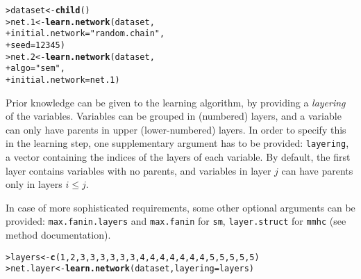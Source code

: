 \documentclass{article}\usepackage[]{graphicx}\usepackage[]{color}
\makeatletter
\newcommand{\hlnum}[1]{\textcolor[rgb]{0.686,0.059,0.569}{#1}}%
\newcommand{\hlstr}[1]{\textcolor[rgb]{0.192,0.494,0.8}{#1}}%
\newcommand{\hlstd}[1]{\textcolor[rgb]{0.345,0.345,0.345}{#1}}%
\newcommand{\hlkwb}[1]{\textcolor[rgb]{0.69,0.353,0.396}{#1}}%
\newcommand{\hlkwc}[1]{\textcolor[rgb]{0.333,0.667,0.333}{#1}}%
\newcommand{\hlkwd}[1]{\textcolor[rgb]{0.737,0.353,0.396}{\textbf{#1}}}%
\newenvironment{kframe}{%
 \def\at@end@of@kframe{}%
 \ifinner\ifhmode%
  \def\at@end@of@kframe{\end{minipage}}%
  \begin{minipage}{\columnwidth}%
 \fi\fi%
 \def\FrameCommand##1{\hskip\@totalleftmargin \hskip-\fboxsep
 \colorbox{shadecolor}{##1}\hskip-\fboxsep
     \hskip-\linewidth \hskip-\@totalleftmargin \hskip\columnwidth}%
 \MakeFramed {\advance\hsize-\width
   \@totalleftmargin\z@ \linewidth\hsize
   \@setminipage}}%
 {\par\unskip\endMakeFramed%
 \at@end@of@kframe}
\newenvironment{knitrout}{}{} %
\newcommand{\Rfunarg}[1]{{\texttt{#1}}}
\makeatother
\begin{document}
\begin{knitrout}
\color{fgcolor}\begin{kframe}
\begin{alltt}
\hlstd{> }\hlstd{dataset} \hlkwb{<-} \hlkwd{child}\hlstd{()}
\hlstd{> }\hlstd{net.1}   \hlkwb{<-} \hlkwd{learn.network}\hlstd{(dataset,}
\hlstd{+ }                         \hlkwc{initial.network} \hlstd{=} \hlstr{"random.chain"}\hlstd{,}
\hlstd{+ }                         \hlkwc{seed} \hlstd{=} \hlnum{12345}\hlstd{)}
\hlstd{> }\hlstd{net.2}   \hlkwb{<-} \hlkwd{learn.network}\hlstd{(dataset,}
\hlstd{+ }                         \hlkwc{algo} \hlstd{=} \hlstr{"sem"}\hlstd{,}
\hlstd{+ }                         \hlkwc{initial.network} \hlstd{= net.1)}
\end{alltt}
\end{kframe}
\end{knitrout}

Prior knowledge can be given to the learning algorithm, by providing a \textit{layering} of the variables.
Variables can be grouped in (numbered) layers, and a variable can only have parents in upper (lower-numbered) layers. In order to specify this in the learning step, one supplementary argument has to be provided: \texttt{layering}, a vector containing the indices of the layers of each variable. By default, the first layer contains variables with no parents, and variables in layer $j$ can have parents only in layers $i \leq j$.

In case of more sophisticated requirements, some other optional arguments can be provided: \Rfunarg{max.fanin.layers} and \Rfunarg{max.fanin} for \Rfunarg{sm}, \Rfunarg{layer.struct} for \Rfunarg{mmhc} (see method documentation).
\begin{knitrout}
\color{fgcolor}\begin{kframe}
\begin{alltt}
\hlstd{> }\hlstd{layers} \hlkwb{<-} \hlkwd{c}\hlstd{(}\hlnum{1}\hlstd{,}\hlnum{2}\hlstd{,}\hlnum{3}\hlstd{,}\hlnum{3}\hlstd{,}\hlnum{3}\hlstd{,}\hlnum{3}\hlstd{,}\hlnum{3}\hlstd{,}\hlnum{3}\hlstd{,}\hlnum{4}\hlstd{,}\hlnum{4}\hlstd{,}\hlnum{4}\hlstd{,}\hlnum{4}\hlstd{,}\hlnum{4}\hlstd{,}\hlnum{4}\hlstd{,}\hlnum{4}\hlstd{,}\hlnum{5}\hlstd{,}\hlnum{5}\hlstd{,}\hlnum{5}\hlstd{,}\hlnum{5}\hlstd{,}\hlnum{5}\hlstd{)}
\hlstd{> }\hlstd{net.layer} \hlkwb{<-} \hlkwd{learn.network}\hlstd{(dataset,} \hlkwc{layering} \hlstd{= layers)}
\end{alltt}
\end{kframe}
\end{knitrout}
\end{document}
